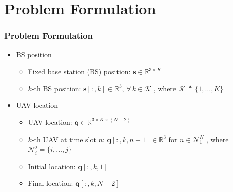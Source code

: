 \documentclass[11.5pt]{beamer}
\begin{document}
\section{Problem Formulation}
\begin{frame}
	\frametitle{Problem Formulation}
	\begin{itemize}\itemsep4em
		\item<1-> BS position
		\begin{itemize}
			\item Fixed base station (BS) position: $\boldsymbol{s}\in\mathbb{R}^{3\times K}$
			\item $k$-th BS position: $\boldsymbol{s}[:,k]\in\mathbb{R}^3,\,\forall\,k\in\mathcal{K}$
				, where $\mathcal{K}\triangleq\{1,\ldots,K\}$
		\end{itemize}
		\item<2-> UAV location
		\begin{itemize}
			\item UAV location: $\boldsymbol{q}\in\mathbb{R}^{3\times K\times (N+2)}$
			\item $k$-th UAV at time slot $n$: $\boldsymbol{q}[:,k,n+1]\in\mathbb{R}^3$ for $n\in\mathcal{N}_1^N$
				, where $\mathcal{N}_i^j=\{i,\ldots,j\}$
			\item Initial location: $\boldsymbol{q}[:,k,1]$
			\item Final location: $\boldsymbol{q}[:,k,N+2]$
		\end{itemize}
	\end{itemize}
\end{frame}
\end{document}
